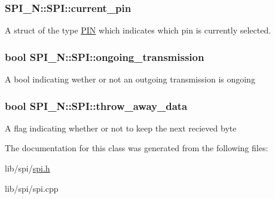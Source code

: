 \subsubsection[{\texorpdfstring{current\+\_\+pin}{current_pin}}]{ S\+P\+I\+\_\+\+N\+::\+S\+P\+I\+::current\+\_\+pin\hspace{0.3cm}{\ttfamily [private]}}\hypertarget{class_s_p_i___n_1_1_s_p_i_ac016c4eaed2db3f8b5523bf0d472ddd2}{}\label{class_s_p_i___n_1_1_s_p_i_ac016c4eaed2db3f8b5523bf0d472ddd2}
A struct of the type \hyperlink{struct_s_p_i___n_1_1_p_i_n}{P\+IN} which indicates which pin is currently selected. 
\subsubsection[{\texorpdfstring{ongoing\+\_\+transmission}{ongoing_transmission}}]{\setlength{\rightskip}{0pt plus 5cm}bool S\+P\+I\+\_\+\+N\+::\+S\+P\+I\+::ongoing\+\_\+transmission\hspace{0.3cm}{\ttfamily [private]}}\hypertarget{class_s_p_i___n_1_1_s_p_i_aff61d4bfc6a6e0088c3653898b1e91b8}{}\label{class_s_p_i___n_1_1_s_p_i_aff61d4bfc6a6e0088c3653898b1e91b8}
A bool indicating wether or not an outgoing transmission is ongoing 
\subsubsection[{\texorpdfstring{throw\+\_\+away\+\_\+data}{throw_away_data}}]{\setlength{\rightskip}{0pt plus 5cm}bool S\+P\+I\+\_\+\+N\+::\+S\+P\+I\+::throw\+\_\+away\+\_\+data\hspace{0.3cm}{\ttfamily [private]}}\hypertarget{class_s_p_i___n_1_1_s_p_i_a7b2d300478662920e6911cea751e1094}{}\label{class_s_p_i___n_1_1_s_p_i_a7b2d300478662920e6911cea751e1094}
A flag indicating whether or not to keep the next recieved byte 

The documentation for this class was generated from the following files\+:\begin{DoxyCompactItemize}
\item 
lib/spi/\hyperlink{spi_8h}{spi.\+h}\item 
lib/spi/spi.\+cpp\end{DoxyCompactItemize}
